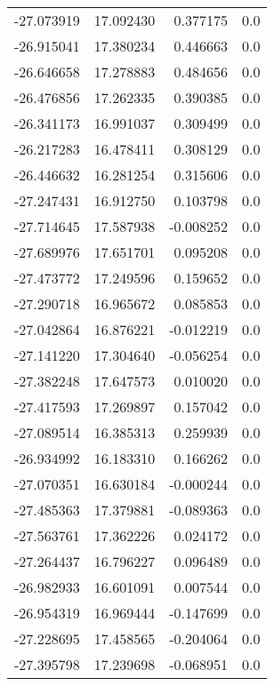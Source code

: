 \begin{tabular}{rrrr}
      -27.073919 &        17.092430 &    0.377175 &   0.0 \\
      -26.915041 &        17.380234 &    0.446663 &   0.0 \\
      -26.646658 &        17.278883 &    0.484656 &   0.0 \\
      -26.476856 &        17.262335 &    0.390385 &   0.0 \\
      -26.341173 &        16.991037 &    0.309499 &   0.0 \\
      -26.217283 &        16.478411 &    0.308129 &   0.0 \\
      -26.446632 &        16.281254 &    0.315606 &   0.0 \\
      -27.247431 &        16.912750 &    0.103798 &   0.0 \\
      -27.714645 &        17.587938 &   -0.008252 &   0.0 \\
      -27.689976 &        17.651701 &    0.095208 &   0.0 \\
      -27.473772 &        17.249596 &    0.159652 &   0.0 \\
      -27.290718 &        16.965672 &    0.085853 &   0.0 \\
      -27.042864 &        16.876221 &   -0.012219 &   0.0 \\
      -27.141220 &        17.304640 &   -0.056254 &   0.0 \\
      -27.382248 &        17.647573 &    0.010020 &   0.0 \\
      -27.417593 &        17.269897 &    0.157042 &   0.0 \\
      -27.089514 &        16.385313 &    0.259939 &   0.0 \\
      -26.934992 &        16.183310 &    0.166262 &   0.0 \\
      -27.070351 &        16.630184 &   -0.000244 &   0.0 \\
      -27.485363 &        17.379881 &   -0.089363 &   0.0 \\
      -27.563761 &        17.362226 &    0.024172 &   0.0 \\
      -27.264437 &        16.796227 &    0.096489 &   0.0 \\
      -26.982933 &        16.601091 &    0.007544 &   0.0 \\
      -26.954319 &        16.969444 &   -0.147699 &   0.0 \\
      -27.228695 &        17.458565 &   -0.204064 &   0.0 \\
      -27.395798 &        17.239698 &   -0.068951 &   0.0 \\

\end{tabular}
